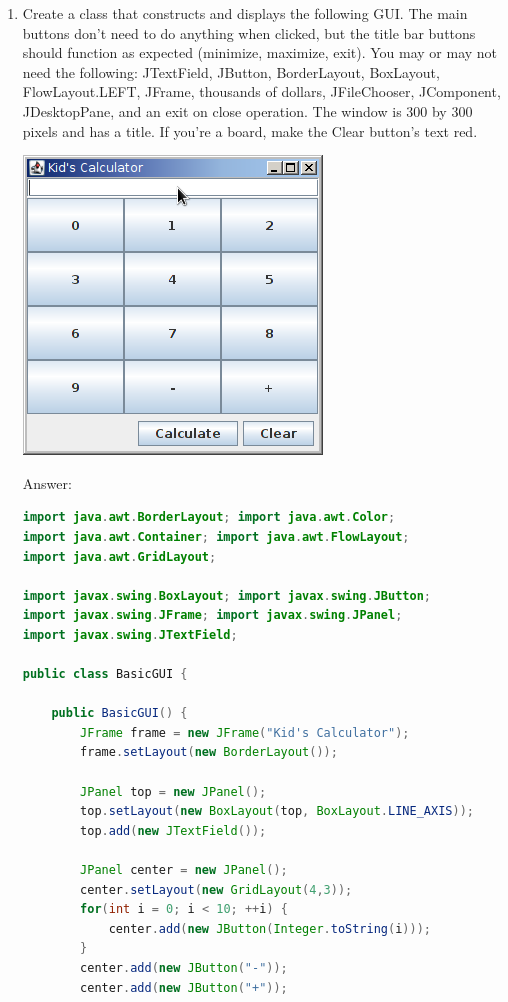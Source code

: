 \documentclass[11pt]{article}
\newenvironment{answer}{\large\lstset{basicstyle=\large\ttfamily}\color{white} \small{Answer:}}{}
\newenvironment{answer}{\large\lstset{basicstyle=\large\ttfamily}\color{red} \small{Answer:}}{}
\begin{document}
\begin{enumerate}
\newpage
\item Create a class that constructs and displays the following GUI.  The main buttons don't need to do anything when clicked, but the title bar buttons should function as expected (minimize, maximize, exit).  You may or may not need the following: JTextField, JButton, BorderLayout, BoxLayout, FlowLayout.LEFT, JFrame, thousands of dollars, JFileChooser, JComponent, JDesktopPane, and an exit on close operation.  The window is 300 by 300 pixels and has a title.  If you're a board, make the Clear button's text red.
\begin{center}
\includegraphics[scale=0.6]{calculator.png}
\end{center}
\begin{answer}
\begin{lstlisting}[language=java]
import java.awt.BorderLayout; import java.awt.Color;
import java.awt.Container; import java.awt.FlowLayout;
import java.awt.GridLayout;

import javax.swing.BoxLayout; import javax.swing.JButton;
import javax.swing.JFrame; import javax.swing.JPanel;
import javax.swing.JTextField;

public class BasicGUI {

	public BasicGUI() {
		JFrame frame = new JFrame("Kid's Calculator");
		frame.setLayout(new BorderLayout());
		
		JPanel top = new JPanel();
		top.setLayout(new BoxLayout(top, BoxLayout.LINE_AXIS));
		top.add(new JTextField());
		
		JPanel center = new JPanel();
		center.setLayout(new GridLayout(4,3));
		for(int i = 0; i < 10; ++i) {
			center.add(new JButton(Integer.toString(i)));
		}
		center.add(new JButton("-"));
		center.add(new JButton("+"));
		

\end{lstlisting}
\end{answer}
\end{enumerate}
\end{document}
